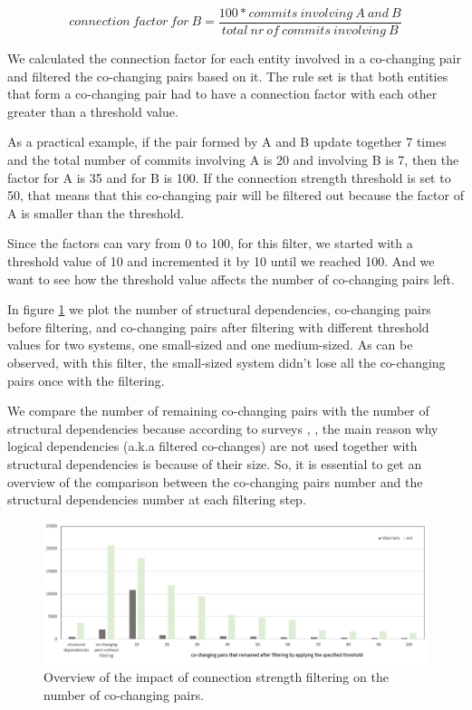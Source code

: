\documentclass[runningheads]{comsis2}
\begin{document}
\begin{equation}
 connection\ factor\ for\ B = \frac{100 * commits\ involving\ A\ and\ B}{total\ nr\ of\ commits\ involving\ B}
\end{equation}



We calculated the connection factor for each entity involved in a co-changing pair and filtered the co-changing pairs based on it. The rule set is that both entities that form a co-changing pair had to have a connection factor with each other greater than a threshold value.

As a practical example, if the pair formed by A and B update together 7 times and the total number of commits involving A is 20 and involving B is 7, then the factor for A is 35 and for B is 100. If the connection strength threshold is set to 50, that means that this co-changing pair will be filtered out because the factor of A is smaller than the threshold. 

Since the factors can vary from 0 to 100, for this filter, we started with a threshold value of 10 and incremented it by 10 until we reached 100. And we want to see how the threshold value affects the number of co-changing pairs left. 

In figure \ref{fig:strength_overview} we plot the number of structural dependencies, co-changing pairs before filtering, and co-changing pairs after filtering with different threshold values for two systems, one small-sized and one medium-sized. As can be observed, with this filter, the small-sized system didn't lose all the co-changing pairs once with the filtering. 

We compare the number of remaining co-changing pairs with the number of structural dependencies because according to surveys \cite{Shtern:2012:CMS:2332427.2332428}, \cite{sar}, the main reason why logical dependencies (a.k.a filtered co-changes) are not used together with structural dependencies is because of their size. So, it is essential to get an overview of the comparison between the co-changing pairs number and the structural dependencies number at each filtering step.

\begin{figure}
\centering
\includegraphics[width=\textwidth]{strength_overview.PNG}
\caption{Overview of the impact of connection strength filtering on the number of co-changing pairs. }
\label{fig:strength_overview}
\centering
\end{figure}
\end{document}
